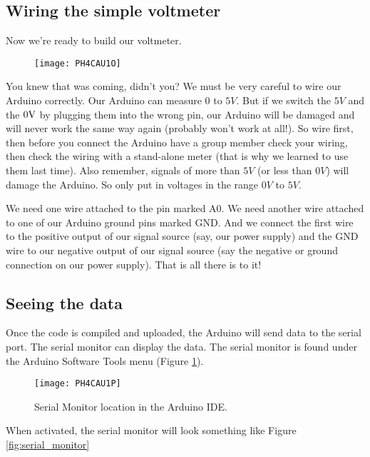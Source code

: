 \subsection{Wiring the simple voltmeter}

Now we're ready to build our voltmeter.

\begin{figure*}[h!]
\centering
\texttt{[image: PH4CAU1O]}
\end{figure*}
You knew that was coming, didn't
you? We must be very careful to wire our Arduino correctly. Our Arduino can
measure $0$ to $5\unit{V}.$ But if we switch the $5\unit{V}$ and the $0\unit{%
V}$ by plugging them into the wrong pin, our Arduino will be damaged and
will never work the same way again (probably won't work at all!). So wire
first, then before you connect the Arduino have a group member check your
wiring, then check the wiring with a stand-alone meter (that is why we
learned to use them last time). Also remember, signals of more than 
$5\unit{V}$ (or less than $0\unit{V}$) will 
damage the Arduino. So only put in voltages in the range $0\unit{V}$ to $5%
\unit{V}.$

We need one wire attached to the pin marked A0. We need another wire
attached to one of our Arduino ground pins marked GND. And we connect the
first wire to the positive output of our signal source (say, our power
supply) and the GND wire to our negative output of our signal source (say
the negative or ground connection on our power supply). That is all there is
to it!

\subsection{Seeing the data}

Once the code is compiled and uploaded, the Arduino will send data to the
serial port. The serial monitor can display the data. The serial monitor is
found under the Arduino Software Tools menu 
(Figure \ref{fig:serial_monitor_menu}).

\begin{figure}[htbp!]
\centering
\texttt{[image: PH4CAU1P]}
\caption[Serial Monitor location in the Arduino IDE]{Serial Monitor
location in the Arduino IDE.}
\label{fig:serial_monitor_menu}
\end{figure}

When activated, the serial monitor will look something like
Figure \ref{fig:serial_monitor}

